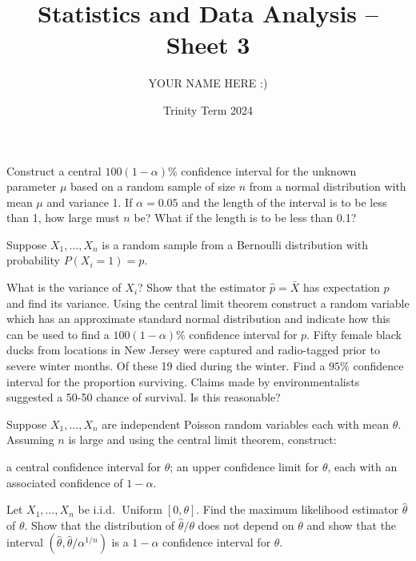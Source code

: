 \documentclass[answers]{exam}
\title{Statistics and Data Analysis -- Sheet 3}
\author{YOUR NAME HERE :)}
\date{Trinity Term 2024}
\begin{document}
\maketitle
\begin{questions}

\question%
Construct a central $100(1-\alpha)\%$ confidence interval for the unknown parameter $\mu$ based on a random sample of size $n$ from a normal distribution with mean $\mu$ and variance 1. If $\alpha=0.05$ and the length of the interval is to be less than 1, how large must $n$ be? What if the length is to be less than 0.1?



\question%
Suppose $X_{1}, \ldots, X_{n}$ is a random sample from a Bernoulli distribution with probability $P(X_{i}=1)=p$.
\begin{subparts}
\subpart What is the variance of $X_{i}$? Show that the estimator $\widehat{p}=\bar{X}$ has expectation $p$ and find its variance.
\subpart Using the central limit theorem construct a random variable which has an approximate standard normal distribution and indicate how this can be used to find a $100(1-\alpha)\%$ confidence interval for $p$.
\subpart Fifty female black ducks from locations in New Jersey were captured and radio-tagged prior to severe winter months. Of these 19 died during the winter. Find a $95\%$ confidence interval for the proportion surviving. Claims made by environmentalists suggested a 50-50 chance of survival. Is this reasonable?
\end{subparts}



\question%
Suppose $X_{1}, \ldots, X_{n}$ are independent Poisson random variables each with mean $\theta$. Assuming $n$ is large and using the central limit theorem, construct:
\begin{subparts}
\subpart a central confidence interval for $\theta$;
\subpart an upper confidence limit for $\theta$, each with an associated confidence of $1-\alpha$.
\end{subparts}



\question%
Let $X_{1}, \ldots, X_{n}$ be i.i.d. $\operatorname{Uniform}[0, \theta]$. Find the maximum likelihood estimator $\widehat{\theta}$ of $\theta$. Show that the distribution of $\widehat{\theta} / \theta$ does not depend on $\theta$ and show that the interval $(\widehat{\theta}, \widehat{\theta} / \alpha^{1 / n})$ is a $1-\alpha$ confidence interval for $\theta$.




\end{questions}
\end{document}
